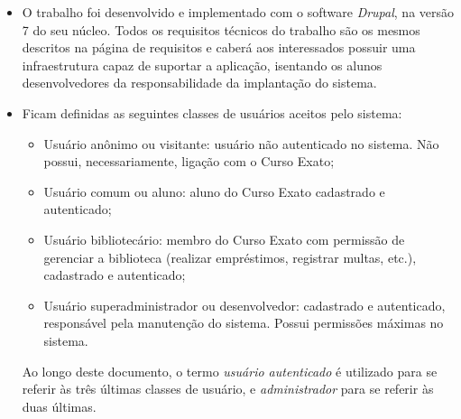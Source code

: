\documentclass[a4paper]{article}
\begin{document}
\begin{itemize}
\item O trabalho foi desenvolvido e implementado com o software \textit{Drupal}, na versão 7 do seu núcleo. Todos os requisitos técnicos do trabalho são os mesmos descritos na página de requisitos \cite{requirements} e caberá aos interessados possuir uma infraestrutura capaz de suportar a aplicação, isentando os alunos desenvolvedores da responsabilidade da implantação do sistema.

\item Ficam definidas as seguintes classes de usuários aceitos pelo sistema:
\begin{itemize}
\item Usuário anônimo ou visitante: usuário não autenticado no sistema. Não possui, necessariamente, ligação com o Curso Exato;
\item Usuário comum ou aluno: aluno do Curso Exato cadastrado e autenticado;
\item Usuário bibliotecário: membro do Curso Exato com permissão de gerenciar a biblioteca (realizar empréstimos, registrar multas, etc.), cadastrado e autenticado;
\item Usuário superadministrador ou desenvolvedor: cadastrado e autenticado, responsável pela manutenção do sistema. Possui permissões máximas no sistema.
\end{itemize}
Ao longo deste documento, o termo \emph{usuário autenticado} é utilizado para se referir às três últimas classes de usuário, e \emph{administrador} para se referir às duas últimas.


\end{itemize}
\end{document}
